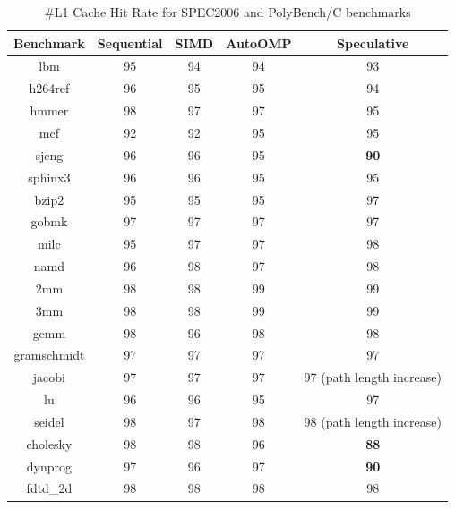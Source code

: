 \documentclass[10pt]{report}          %
\begin{document}
\begin{table}
\centering
\caption{\#L1 Cache Hit Rate for SPEC2006 and PolyBench/C benchmarks}
\begin{tabular}{|c||c|c|c|c|} \hline
Benchmark &Sequential & SIMD & AutoOMP & Speculative\\ \hline 
lbm & 95 & 94 & 94 & 93\\ \hline
h264ref & 96 & 95 & 95 & 94 \\ \hline
hmmer &	98 & 97 & 97 & 95  \\ \hline
mcf & 92 & 92 & 95 & 95 \\ \hline
sjeng &	96 & 96 & 95 & \textbf{90} \\ \hline
sphinx3 & 96 & 96 & 95 & 95  \\ \hline
bzip2 & 95 & 95 & 95 & 97  \\ \hline
gobmk & 97 & 97 & 97 & 97  \\ \hline
milc & 95 & 97 & 97 & 98  \\ \hline
namd & 96 & 98 & 97 & 98  \\ \hline
2mm	& 98 & 98 & 99 & 99 \\ \hline
3mm	& 98 & 98 & 99 & 99 \\ \hline
gemm	 & 98 & 96 & 98 & 98\\ \hline
gramschmidt	& 97 & 97 & 97 & 97 \\ \hline
jacobi & 97& 97 & 97 & 97 (path length increase) \\ \hline
lu	& 96 & 96 & 95 & 97 \\ \hline
seidel&	98 & 97 & 98 & 98 (path length increase) \\ \hline
cholesky & 98 & 98 & 96 & \textbf{88}\\ \hline
dynprog & 97 & 96 & 97 & \textbf{90}\\ \hline
fdtd\_2d & 98 & 98 & 98 & 98 \\ \hline
\hline\end{tabular}
\label{table:spec_committed}
\end{table}
\end{document}
